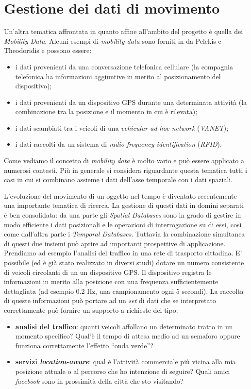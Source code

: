 \section{Gestione dei dati di movimento}
Un'altra tematica affrontata in quanto affine all'ambito del progetto è quella dei \emph{Mobility Data}. Alcuni esempi di \emph{mobility data} sono forniti in \cite{mdme} da Pelekis e Theodoridis e possono essere:
\begin{itemize}
  \item i dati provenienti da una conversazione telefonica cellulare (la compagnia telefonica ha informazioni aggiuntive in merito al posizionamento del dispositivo);
  \item i dati provenienti da un dispositivo GPS durante una determinata attività (la combinazione tra la posizione e il momento in cui è rilevata);
  \item i dati scambiati tra i veicoli di una \emph{vehicular ad hoc network} (\emph{VANET});
  \item i dati raccolti da un sistema di \emph{radio-frequency identification} (\emph{RFID}).
\end{itemize}
Come vediamo il concetto di \emph{mobility data} è molto vario e può essere applicato a numerosi contesti. Più in generale si considera riguardante questa tematica tutti i casi in cui si combinano assieme i dati dell'asse temporale con i dati spaziali. 

L'evoluzione del movimento di un oggetto nel tempo è diventato recentemente una importante tematica di ricerca. La gestione di questi dati in domini separati è ben consolidata: da una parte gli \emph{Spatial Databases} sono in grado di gestire in modo efficiente i dati posizionali e le operazioni di interrogazione su di essi, così come dall'altra parte i \emph{Temporal Databases}. Tuttavia la combinazione simultanea di questi due insiemi può aprire ad importanti prospettive di applicazione. Prendiamo ad esempio l'analisi del traffico in una rete di trasporto cittadina. E' possibile (ed è già stato realizzato in diversi studi) dotare un numero consistente di veicoli circolanti di un un dispositivo GPS. Il dispositivo registra le informazioni in merito alla posizione con una frequenza sufficientemente dettagliata (ad esempio 0.2 Hz, una campionamento ogni 5 secondi). La raccolta di queste informazioni può portare ad un \emph{set} di dati che se interpretato correttamente può fornire un supporto a richieste del tipo:
\begin{itemize}
  \item \textbf{analisi del traffico}: quanti veicoli affollano un determinato tratto in un momento specifico? Qual'è il tempo di attesa medio ad un semaforo oppure funziona correttamente l'effetto ``onda verde''?
  \item \textbf{servizi \emph{location-aware}}: qual è l'attività commerciale più vicina alla mia posizione attuale o al percorso che ho intenzione di seguire? Quali amici \emph{facebook} sono in prossimità della città che sto visitando?
\end{itemize}


